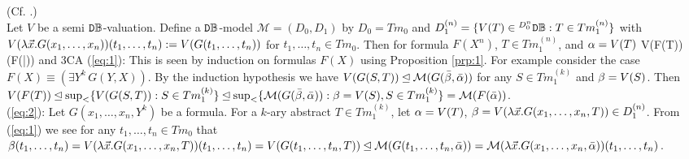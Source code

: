 \documentclass{article}
\begin{document}
\blem\label{lem:2}{\rm (Cf. \cite{GirardB}.)}
\\
Let $V$ be a semi ${\tt D}\mathbb{B}$-valuation.
Define a ${\tt D}\mathbb{B}$-model $\mathcal{M}=(D_{0},D_{1})$ by
$D_{0}=Tm_{0}$ and $D_{1}^{(n)}=\{V(T)\in{}^{D_{0}^{n}}{\tt D}\mathbb{B}: T\in Tm^{(n)}_{1}\}$ with 
$V(\lambda \vec{x}. G(x_{1},\ldots,x_{n}))(t_{1},\ldots,t_{n}):=V(G(t_{1},\ldots,t_{n}))$ for $t_{1},\ldots,t_{n}\in Tm_{0}$.
Then
for formula $F(X^{n})$, $T\in Tm^{(n)}_{1}$, and $\alpha=V(T)$
\beqn\label{eq:1}
V(F(T))\unlhd{}(F(\bar{\alp}))
\eeqn
and
\beqn\label{eq:2}
\models 3CA
\eeqn
\elem
\bprf
(\ref{eq:1}):
This is seen by induction on formulas $F(X)$ using Proposition \ref{prp:1}.
For example consider the case $F(X)\equiv(\exi Y^{k}\, G(Y,X))$.
By the induction hypothesis we have 
$V(G(S,T))\unlhd\mathcal{M}(G(\bar{\beta},\bar{\alpha}))$  for any $S\in Tm_{1}^{(k)}$ and $ \beta=V(S)$.
Then
$V(F(T))\unlhd\sup_{<}\{V(G(S,T)): S\in Tm_{1}^{(k)}\}\unlhd\sup_{<}\{\mathcal{M}(G(\bar{\beta},\bar{\alpha})): \beta=V(S), S\in Tm_{1}^{(k)}\}=
\mathcal{M}(F(\bar{\alpha}))$.
\\
(\ref{eq:2}):
Let $G(x_{1},\ldots,x_{n},Y^{k})$ be a formula.
For a $k$-ary abstract $T\in Tm_{1}^{(k)}$, let $\alpha=V(T)$, $\beta=V(\lambda \vec{x}. G(x_{1},\ldots,x_{n},T))\in D_{1}^{(n)}$.
From (\ref{eq:1}) we see for any $t_{1},\ldots,t_{n}\in Tm_{0}$ that
$\beta(t_{1},\ldots,t_{n})=V(\lambda \vec{x}. G(x_{1},\ldots,x_{n},T))(t_{1},\ldots,t_{n})=V(G(t_{1},\ldots,t_{n},T))\unlhd\mathcal{M}(G(t_{1},\ldots,t_{n},\bar{\alpha}))=\mathcal{M}(\lambda \vec{x}. G(x_{1},\ldots,x_{n},\bar{\alpha}))(t_{1},\ldots,t_{n})$.
\eprf
\end{document}
